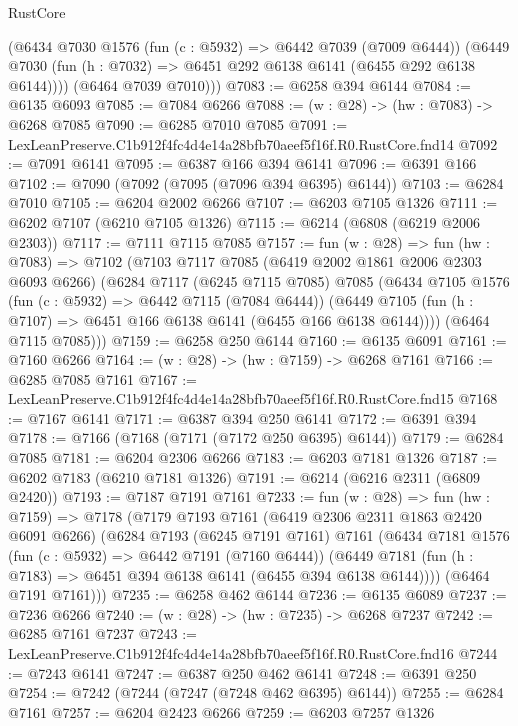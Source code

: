 \begin{lexlean}{RustCore}
\begin{coremodule}
        (@6434
          @7030
          @1576
          (fun (c : @5932) => @6442 @7039 (@7009 @6444))
          (@6449 @7030 (fun (h : @7032) => @6451 @292 @6138 @6141 (@6455 @292 @6138 @6144))))
        (@6464 @7039 @7010)))
@7083 := @6258 @394 @6144
@7084 := @6135 @6093
@7085 := @7084 @6266
@7088 := (w : @28) -> (hw : @7083) -> @6268 @7085
@7090 := @6285 @7010 @7085
@7091 := LexLeanPreserve.C1b912f4fc4d4e14a28bfb70aeef5f16f.R0.RustCore.fnd14
@7092 := @7091 @6141
@7095 := @6387 @166 @394 @6141
@7096 := @6391 @166
@7102 := @7090 (@7092 (@7095 (@7096 @394 @6395) @6144))
@7103 := @6284 @7010
@7105 := @6204 @2002 @6266
@7107 := @6203 @7105 @1326
@7111 := @6202 @7107 (@6210 @7105 @1326)
@7115 := @6214 (@6808 (@6219 @2006 @2303))
@7117 := @7111 @7115 @7085
@7157 := fun (w : @28) =>
  fun (hw : @7083) =>
  @7102
    (@7103
      @7117
      @7085
      (@6419 @2002 @1861 @2006 @2303 @6093 @6266)
      (@6284
        @7117
        (@6245 @7115 @7085)
        @7085
        (@6434
          @7105
          @1576
          (fun (c : @5932) => @6442 @7115 (@7084 @6444))
          (@6449 @7105 (fun (h : @7107) => @6451 @166 @6138 @6141 (@6455 @166 @6138 @6144))))
        (@6464 @7115 @7085)))
@7159 := @6258 @250 @6144
@7160 := @6135 @6091
@7161 := @7160 @6266
@7164 := (w : @28) -> (hw : @7159) -> @6268 @7161
@7166 := @6285 @7085 @7161
@7167 := LexLeanPreserve.C1b912f4fc4d4e14a28bfb70aeef5f16f.R0.RustCore.fnd15
@7168 := @7167 @6141
@7171 := @6387 @394 @250 @6141
@7172 := @6391 @394
@7178 := @7166 (@7168 (@7171 (@7172 @250 @6395) @6144))
@7179 := @6284 @7085
@7181 := @6204 @2306 @6266
@7183 := @6203 @7181 @1326
@7187 := @6202 @7183 (@6210 @7181 @1326)
@7191 := @6214 (@6216 @2311 (@6809 @2420))
@7193 := @7187 @7191 @7161
@7233 := fun (w : @28) =>
  fun (hw : @7159) =>
  @7178
    (@7179
      @7193
      @7161
      (@6419 @2306 @2311 @1863 @2420 @6091 @6266)
      (@6284
        @7193
        (@6245 @7191 @7161)
        @7161
        (@6434
          @7181
          @1576
          (fun (c : @5932) => @6442 @7191 (@7160 @6444))
          (@6449 @7181 (fun (h : @7183) => @6451 @394 @6138 @6141 (@6455 @394 @6138 @6144))))
        (@6464 @7191 @7161)))
@7235 := @6258 @462 @6144
@7236 := @6135 @6089
@7237 := @7236 @6266
@7240 := (w : @28) -> (hw : @7235) -> @6268 @7237
@7242 := @6285 @7161 @7237
@7243 := LexLeanPreserve.C1b912f4fc4d4e14a28bfb70aeef5f16f.R0.RustCore.fnd16
@7244 := @7243 @6141
@7247 := @6387 @250 @462 @6141
@7248 := @6391 @250
@7254 := @7242 (@7244 (@7247 (@7248 @462 @6395) @6144))
@7255 := @6284 @7161
@7257 := @6204 @2423 @6266
@7259 := @6203 @7257 @1326

\end{coremodule}
\end{lexlean}
